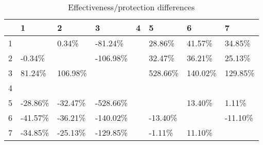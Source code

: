 \begin{table}[ht]
\centering
\begin{tabular}{rlllllll}
  \hline
 & 1 & 2 & 3 & 4 & 5 & 6 & 7 \\ 
  \hline
1 &  & 0.34\% & -81.24\% &  & 28.86\% & 41.57\% & 34.85\% \\ 
  2 & -0.34\% &  & -106.98\% &  & 32.47\% & 36.21\% & 25.13\% \\ 
  3 & 81.24\% & 106.98\% &  &  & 528.66\% & 140.02\% & 129.85\% \\ 
  4 &  &  &  &  &  &  &  \\ 
  5 & -28.86\% & -32.47\% & -528.66\% &  &  & 13.40\% & 1.11\% \\ 
  6 & -41.57\% & -36.21\% & -140.02\% &  & -13.40\% &  & -11.10\% \\ 
  7 & -34.85\% & -25.13\% & -129.85\% &  & -1.11\% & 11.10\% &  \\ 
   \hline
\end{tabular}
\caption{Effectiveness/protection differences} 
\end{table}
